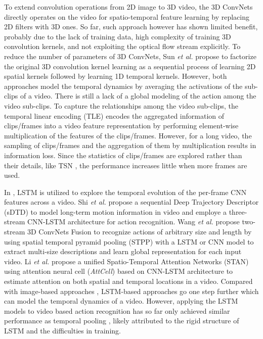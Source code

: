 \documentclass[english, 10pt, twocolumn, twoside]{IEEEtran}
\begin{document}
To extend convolution operations from 2D image to 3D video, the 3D ConvNets \cite{tran2015learning} directly operates on the video for spatio-temporal feature learning by replacing 2D filters with 3D ones. So far, such approach however has shown limited benefit, probably due to the lack of training data, high complexity of training 3D convolution kernels, and not exploiting the optical flow stream explicitly. To reduce the number of parameters of 3D ConvNets, Sun \emph{et al.} \cite{sun2015human} propose to factorize the original 3D convolution kernel learning as a sequential process of learning 2D spatial kernels followed by learning 1D temporal kernels. However, both approaches model the temporal dynamics by averaging the activations of the sub-clips of a video. There is still a lack of a global modeling of the action among the video sub-clips. To capture the relationships among the video sub-clips, the temporal linear encoding (TLE) \cite{diba2016deep} encodes the aggregated information of  clips/frames into a video feature representation by performing element-wise multiplication of the features of the clips/frames. However, for a long video, the sampling of  clips/frames and the aggregation of them by multiplication results in information loss. Since the statistics of clips/frames are explored rather than their details, like TSN \cite{wang2016temporal}, the performance increases little when more frames are used.

In \cite{yue2015beyond,donahue2015long,sharma2015actionattention,li2016videolstm}, LSTM is utilized to explore the temporal evolution of the per-frame CNN features across a video. Shi \emph{et al.} \cite{shi2017sequential} propose a sequential Deep Trajectory Descriptor (sDTD) to model long-term motion information in video and employe a three-stream CNN-LSTM architecture for action recognition. Wang \emph{et al.} \cite{wang2018two-stream} propose two-stream 3D ConvNets Fusion to recognize actions of arbitrary size and length by using spatial temporal pyramid pooling (STPP) with a LSTM or CNN model to extract multi-size descriptions and learn global representation for each input video. Li \emph{et al.} \cite{LiUnified} propose a unified Spatio-Temporal Attention Networks (STAN) using attention neural cell (\emph{AttCell}) based on CNN-LSTM architecture to estimate attention on both spatial and temporal locations in a video. Compared with image-based approaches \cite{simonyan2014two,wang2016temporal}, LSTM-based approaches go one step further which can model the temporal dynamics of a video. However, applying the LSTM models to video based action recognition has so far only achieved similar performance as temporal pooling \cite{yue2015beyond}, likely attributed to the rigid structure of LSTM and the difficulties in training.
\end{document}
